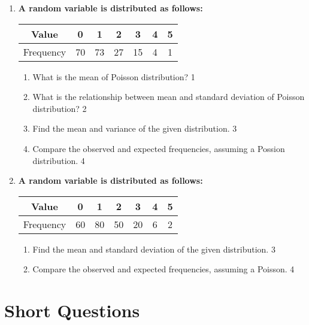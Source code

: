 \documentclass[a4paper,oneside, margin=1.4in]{book}
\begin{document}
\begin{enumerate}
 \item
	  \textbf{A random variable is distributed as follows:} 
	  
	  \begin{table}[h]
	  \centering
\begin{tabular}{c|c|c|c|c|c|c}
Value & 0 & 1 & 2 & 3 & 4 & 5 \\ \hline
Frequency & 70 & 73 & 27 & 15 & 4 & 1
\end{tabular}
\end{table}
  
  \begin{enumerate}
    \item
	What is the mean of Poisson distribution? \hfill 1
    \item
	What is the relationship between mean and standard deviation of Poisson 
	distribution? \hfill 2
    \item  
	Find the mean and variance of the given distribution. \hfill 3
    \item
	Compare the observed and expected frequencies, assuming a Possion 
	distribution. \hfill 4
  \end{enumerate}
  
  \item  
\textbf{A random variable is distributed as follows:}  

\begin{table}[h]
\centering
\begin{tabular}{c|c|c|c|c|c|c}
Value & 0 & 1 & 2 & 3 & 4 & 5 \\ \hline
Frequency & 60 & 80 & 50 & 20 & 6 & 2
\end{tabular}
\end{table}

\begin{enumerate}
    \item  
    Find the mean and standard deviation of the given distribution. \hfill 3
    \item  
    Compare the observed and expected frequencies, assuming a Poisson. \hfill 4
\end{enumerate}


  \end{enumerate}

\section{Short Questions}
\end{document}
